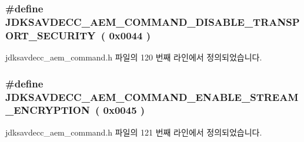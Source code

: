 \subsubsection[{\texorpdfstring{J\+D\+K\+S\+A\+V\+D\+E\+C\+C\+\_\+\+A\+E\+M\+\_\+\+C\+O\+M\+M\+A\+N\+D\+\_\+\+D\+I\+S\+A\+B\+L\+E\+\_\+\+T\+R\+A\+N\+S\+P\+O\+R\+T\+\_\+\+S\+E\+C\+U\+R\+I\+TY}{JDKSAVDECC_AEM_COMMAND_DISABLE_TRANSPORT_SECURITY}}]{\setlength{\rightskip}{0pt plus 5cm}\#define J\+D\+K\+S\+A\+V\+D\+E\+C\+C\+\_\+\+A\+E\+M\+\_\+\+C\+O\+M\+M\+A\+N\+D\+\_\+\+D\+I\+S\+A\+B\+L\+E\+\_\+\+T\+R\+A\+N\+S\+P\+O\+R\+T\+\_\+\+S\+E\+C\+U\+R\+I\+TY~( 0x0044 )}\hypertarget{group__command_ga90c0c7506e4219bda99fd02c4fa7a9f4}{}\label{group__command_ga90c0c7506e4219bda99fd02c4fa7a9f4}


jdksavdecc\+\_\+aem\+\_\+command.\+h 파일의 120 번째 라인에서 정의되었습니다.

\subsubsection[{\texorpdfstring{J\+D\+K\+S\+A\+V\+D\+E\+C\+C\+\_\+\+A\+E\+M\+\_\+\+C\+O\+M\+M\+A\+N\+D\+\_\+\+E\+N\+A\+B\+L\+E\+\_\+\+S\+T\+R\+E\+A\+M\+\_\+\+E\+N\+C\+R\+Y\+P\+T\+I\+ON}{JDKSAVDECC_AEM_COMMAND_ENABLE_STREAM_ENCRYPTION}}]{\setlength{\rightskip}{0pt plus 5cm}\#define J\+D\+K\+S\+A\+V\+D\+E\+C\+C\+\_\+\+A\+E\+M\+\_\+\+C\+O\+M\+M\+A\+N\+D\+\_\+\+E\+N\+A\+B\+L\+E\+\_\+\+S\+T\+R\+E\+A\+M\+\_\+\+E\+N\+C\+R\+Y\+P\+T\+I\+ON~( 0x0045 )}\hypertarget{group__command_ga338f311d32334fb87757ade2bf8abf38}{}\label{group__command_ga338f311d32334fb87757ade2bf8abf38}


jdksavdecc\+\_\+aem\+\_\+command.\+h 파일의 121 번째 라인에서 정의되었습니다.

